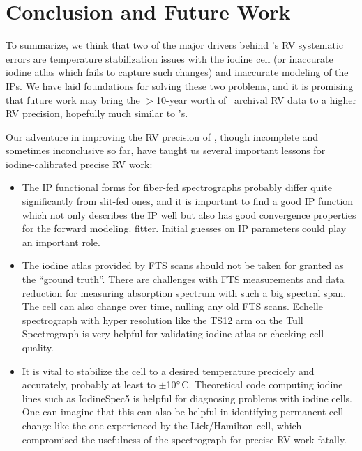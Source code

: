 


 

 
\section{Conclusion and Future Work}\label{het:sec:conclusion}
 
To summarize, we think that two of the major drivers behind \het's RV
systematic errors are temperature stabilization issues with the iodine
cell (or inaccurate iodine atlas which fails to capture such changes)
and inaccurate modeling of the IPs. We have laid foundations for
solving these two problems, and it is promising that future work may
bring the $>$10-year worth of \het\ archival RV data to a higher RV
precision, hopefully much similar to \keck's.

Our adventure in improving the RV precision of \het, though incomplete
and sometimes inconclusive so far, have taught us several important
lessons for iodine-calibrated precise RV work:

\begin{itemize}
  \item The IP functional forms for fiber-fed spectrographs probably
differ quite significantly from slit-fed ones, and it is important to
find a good IP function which not only describes the IP well but also
has good convergence properties for the forward modeling.
fitter. Initial guesses on IP parameters could play an important role.
  \item The iodine atlas provided by FTS scans should not be taken for
granted as the ``ground truth''. There are challenges with FTS
measurements and data reduction for measuring absorption spectrum with
such a big spectral span. The cell can also change over time, nulling
any old FTS scans. Echelle spectrograph with hyper resolution like the
TS12 arm on the Tull Spectrograph is very helpful for validating
iodine atlas or checking cell quality.
  \item It is vital to stabilize the cell to a desired temperature
precicely and accurately, probably at least to
$\pm$10$^{\circ}$C. Theoretical code computing iodine lines such as
IodineSpec5 is helpful for diagnosing problems with iodine cells. One
can imagine that this can also be helpful in identifying permanent
cell change like the one experienced by the Lick/Hamilton cell, which
compromised the usefulness of the spectrograph for precise RV work
fatally.
\end{itemize}

